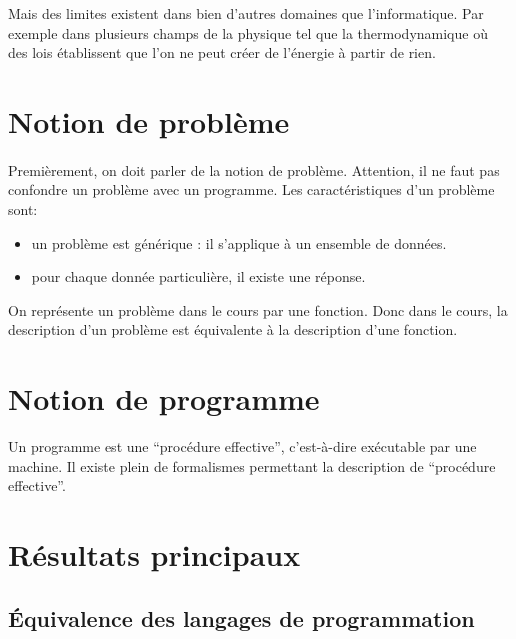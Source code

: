 Mais des limites existent dans bien d'autres domaines que l'informatique. 
Par exemple dans plusieurs champs de la physique tel que la 
thermodynamique où des lois établissent que l'on ne peut créer de l'énergie à partir de rien.


\section{Notion de problème}
\label{sec:notion_de_probl_me}

\paragraph{}
Premièrement, on doit parler de la notion de problème.
Attention, il ne faut pas confondre un problème avec un programme.
Les caractéristiques d'un problème sont:

\begin{itemize}
	\item un problème est générique : il s'applique à un ensemble de données.
	\item pour chaque donnée particulière, il existe une réponse.
\end{itemize}
On représente un problème dans le cours par une fonction. Donc dans le cours,
la description d'un problème est équivalente à la description d'une fonction.

\section{Notion de programme}
\label{sec:notion_de_programme}

Un programme est une ``procédure effective'', c'est-à-dire exécutable par une machine.
Il existe plein de formalismes permettant la description de ``procédure effective''.



\section{Résultats principaux}
\label{sec:r_sultat_principaux}

\subsection{ Équivalence des langages de programmation}
\label{subsec:equivalence_des_langages_de_programmation}

